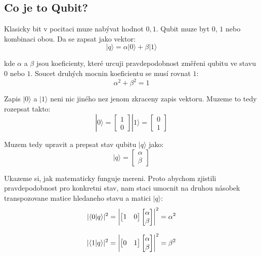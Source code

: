 \documentclass[11pt]{article}
\DeclarePairedDelimiter{\abs}{\lvert}{\rvert}
\begin{document}
\subsection{Co je to Qubit?}
Klasicky bit v pocitaci muze nabývat hodnot ${0, 1}$. Qubit muze byt $0$, $1$ nebo kombinaci obou. Da se zapsat jako vektor:
$$|q\rangle = \alpha|0\rangle + \beta|1\rangle$$
\par kde $\alpha$ a $\beta$ jsou koeficienty, které urcuji pravdepodobnost změřeni qubitu ve stavu $0$ nebo $1$.
Soucet druhých mocnin koeficientu se musí rovnat $1$:
$$\alpha^2 + \beta^2 = 1$$
\par Zapis $|0\rangle$ a $|1\rangle$ neni nic jiného nez jenom zkraceny zapis vektoru.
Muzeme to tedy rozepsat takto:
$$|0\rangle = \begin{bmatrix}
        1 \\
        0
    \end{bmatrix} |1\rangle = \begin{bmatrix}
        0 \\
        1
    \end{bmatrix}  $$
\par Muzem tedy upravit a prepsat stav qubitu $|q\rangle$ jako:
$$|q\rangle = \begin{bmatrix}
        \alpha \\
        \beta
    \end{bmatrix}$$

\par Ukazeme si, jak matematicky funguje mereni.
Proto abychom zjistili pravdepodobnost pro konkretni stav, nam staci umocnit na druhou násobek transpozovane matice hledaneho stavu a matici $|q\rangle$:
$$|\langle 0 | q \rangle|^2 = \abs*{\begin{bmatrix}
            1 & 0
        \end{bmatrix}\begin{bmatrix}
            \alpha \\
            \beta
        \end{bmatrix}}^2 = \alpha ^ 2$$

$$|\langle 1 | q \rangle|^2 = \abs*{\begin{bmatrix}
            0 & 1
        \end{bmatrix}\begin{bmatrix}
            \alpha \\
            \beta
        \end{bmatrix}}^2 = \beta ^ 2$$
\end{document}
